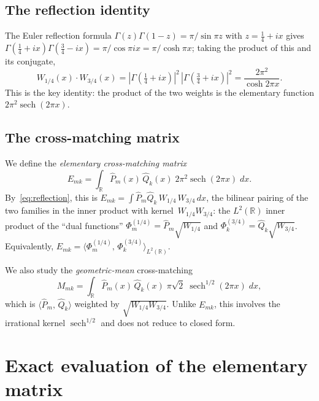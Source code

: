\documentclass[11pt,a4paper]{article}
\newcommand{\R}{\mathbb{R}}
\begin{document}
\subsection{The reflection identity}

The Euler reflection formula
$\Gamma(z)\Gamma(1-z) = \pi/\sin\pi z$ with $z = \tfrac14 + ix$
gives
$\Gamma(\tfrac14+ix)\Gamma(\tfrac34-ix) = \pi/\cos\pi ix
= \pi/\cosh\pi x$; taking the product of this and its conjugate,
\begin{equation}\label{eq:reflection}
  W_{1/4}(x)\cdot W_{3/4}(x)
  = |\Gamma(\tfrac14+ix)|^2\,|\Gamma(\tfrac34+ix)|^2
  = \frac{2\pi^2}{\cosh 2\pi x}.
\end{equation}
This is the key identity: the product of the two weights is the
elementary function $2\pi^2\operatorname{sech}(2\pi x)$.

\subsection{The cross-matching matrix}

We define the \emph{elementary cross-matching matrix}
\begin{equation}\label{eq:Edef}
  E_{mk} = \int_\R \widehat{P}_m(x)\,\widehat{Q}_k(x)\;
    2\pi^2\operatorname{sech}(2\pi x)\; dx.
\end{equation}
By~\eqref{eq:reflection}, this is
$E_{mk} = \int \widehat{P}_m \widehat{Q}_k\,
W_{1/4}\,W_{3/4}\,dx$, the bilinear pairing of the two families
in the inner product with kernel~$W_{1/4}W_{3/4}$: the
$L^2(\R)$ inner product of the ``dual functions''
$\Phi_m^{(1/4)} = \widehat{P}_m\sqrt{W_{1/4}}$ and
$\Phi_k^{(3/4)} = \widehat{Q}_k\sqrt{W_{3/4}}$. Equivalently,
$E_{mk} = \langle \Phi_m^{(1/4)},\, \Phi_k^{(3/4)}\rangle_{L^2(\R)}$.

We also study the \emph{geometric-mean} cross-matching
\[
  M_{mk} = \int_\R \widehat{P}_m(x)\,\widehat{Q}_k(x)\;
    \pi\sqrt{2}\;\operatorname{sech}^{1/2}(2\pi x)\; dx,
\]
which is $\langle \widehat{P}_m,\, \widehat{Q}_k\rangle$
weighted by $\sqrt{W_{1/4}W_{3/4}}$. Unlike $E_{mk}$, this
involves the irrational kernel $\operatorname{sech}^{1/2}$ and
does not reduce to closed form.

\section{Exact evaluation of the elementary matrix}
\end{document}
